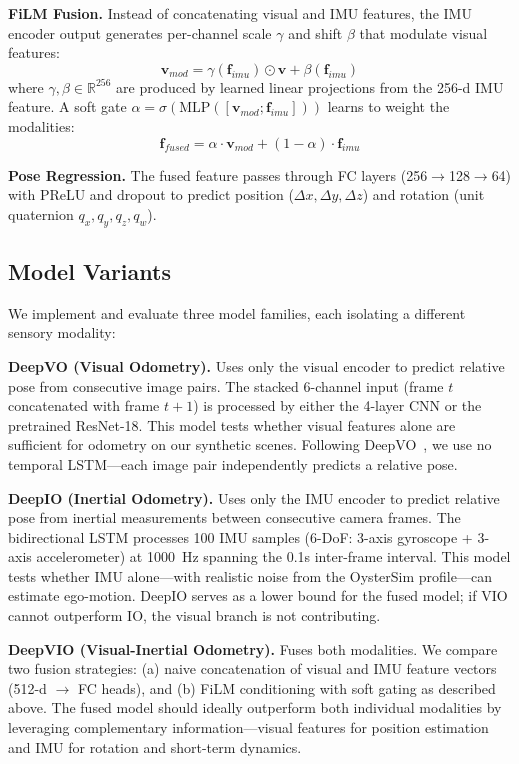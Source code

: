 \documentclass[conference]{IEEEtran}
\begin{document}
\textbf{FiLM Fusion.} Instead of concatenating visual and IMU features, the IMU encoder output generates per-channel scale $\gamma$ and shift $\beta$ that modulate visual features:
\begin{equation}
    \mathbf{v}_{mod} = \gamma(\mathbf{f}_{imu}) \odot \mathbf{v} + \beta(\mathbf{f}_{imu})
\end{equation}
where $\gamma, \beta \in \mathbb{R}^{256}$ are produced by learned linear projections from the 256-d IMU feature. A soft gate $\alpha = \sigma(\text{MLP}([\mathbf{v}_{mod}; \mathbf{f}_{imu}]))$ learns to weight the modalities:
\begin{equation}
    \mathbf{f}_{fused} = \alpha \cdot \mathbf{v}_{mod} + (1 - \alpha) \cdot \mathbf{f}_{imu}
\end{equation}

\textbf{Pose Regression.} The fused feature passes through FC layers (256$\to$128$\to$64) with PReLU and dropout to predict position ($\Delta x, \Delta y, \Delta z$) and rotation (unit quaternion $q_x, q_y, q_z, q_w$).

\subsection{Model Variants}

We implement and evaluate three model families, each isolating a different sensory modality:

\textbf{DeepVO (Visual Odometry).} Uses only the visual encoder to predict relative pose from consecutive image pairs. The stacked 6-channel input (frame $t$ concatenated with frame $t+1$) is processed by either the 4-layer CNN or the pretrained ResNet-18. This model tests whether visual features alone are sufficient for odometry on our synthetic scenes. Following DeepVO~\cite{wang2017}, we use no temporal LSTM---each image pair independently predicts a relative pose.

\textbf{DeepIO (Inertial Odometry).} Uses only the IMU encoder to predict relative pose from inertial measurements between consecutive camera frames. The bidirectional LSTM processes 100 IMU samples (6-DoF: 3-axis gyroscope + 3-axis accelerometer) at 1000~Hz spanning the 0.1s inter-frame interval. This model tests whether IMU alone---with realistic noise from the OysterSim profile---can estimate ego-motion. DeepIO serves as a lower bound for the fused model; if VIO cannot outperform IO, the visual branch is not contributing.

\textbf{DeepVIO (Visual-Inertial Odometry).} Fuses both modalities. We compare two fusion strategies: (a) naive concatenation of visual and IMU feature vectors (512-d $\to$ FC heads), and (b) FiLM conditioning with soft gating as described above. The fused model should ideally outperform both individual modalities by leveraging complementary information---visual features for position estimation and IMU for rotation and short-term dynamics.
\end{document}
